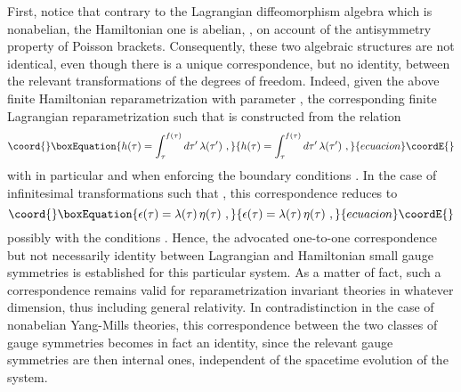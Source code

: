 \documentclass[a4paper,11pt]{article}
\begin{document}
First, notice that contrary to the Lagrangian diffeomorphism algebra
which is nonabelian, the Hamiltonian one is abelian, \coordHE{},
on account of the antisymmetry property of Poisson brackets. Consequently,
these two algebraic structures are not identical, even though there is
a unique correspondence, but no identity, between the relevant transformations
of the degrees of freedom. Indeed, given the above finite
Hamiltonian reparametrization with parameter \coordHE{}, the corresponding
finite Lagrangian reparametrization such that \coordHE{}
is constructed from the relation\cite{JG1}
\begin{equation}\coord{}\boxEquation{
h(\tau)=\int_\tau^{f(\tau)}d\tau'\,\lambda(\tau')\ ,
}{
h(\tau)=\int_\tau^{f(\tau)}d\tau'\,\lambda(\tau')\ ,
}{ecuacion}\coordE{}\end{equation}
with in particular \coordHE{} and \coordHE{} when
enforcing the boundary conditions \coordHE{}. In the
case of infinitesimal transformations such that \coordHE{}, 
this correspondence reduces to
\begin{equation}\coord{}\boxEquation{
\epsilon(\tau)=\lambda(\tau)\,\eta(\tau)\ ,
}{
\epsilon(\tau)=\lambda(\tau)\,\eta(\tau)\ ,
}{ecuacion}\coordE{}\end{equation}
possibly with the conditions \coordHE{}.
Hence, the advocated one-to-one correspondence but not necessarily
identity between Lagrangian and Hamiltonian small gauge symmetries is
established for this particular system. As a matter of fact, such a
correspondence remains valid for reparametrization invariant theories
in whatever dimension, thus including general relativity. In contradistinction
in the case of nonabelian Yang-Mills theories, this cor\-res\-pon\-den\-ce 
between the two classes of gauge symmetries becomes in fact an identity, since
the relevant gauge symmetries are then internal ones, independent of the
spacetime evolution of the system.
\end{document}
